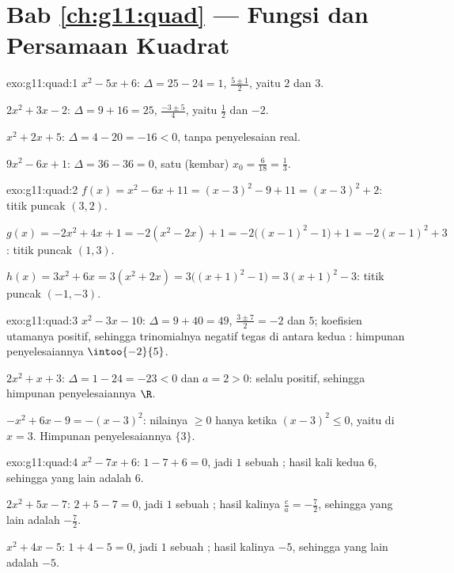 \section*{Bab \ref{ch:g11:quad} --- Fungsi dan Persamaan Kuadrat}

\begin{solution}{exo:g11:quad:1}
$x^2-5x+6$: $\Delta = 25 - 24 = 1$,  $\frac{5 \pm 1}{2}$, yaitu $2$
dan $3$.

$2x^2+3x-2$: $\Delta = 9 + 16 = 25$,  $\frac{-3 \pm 5}{4}$, yaitu
$\frac12$ dan $-2$.

$x^2+2x+5$: $\Delta = 4 - 20 = -16 < 0$, tanpa penyelesaian real.

$9x^2-6x+1$: $\Delta = 36 - 36 = 0$, satu  (kembar)
$x_0 = \frac{6}{18} = \frac13$.
\end{solution}

\begin{solution}{exo:g11:quad:2}
$f(x) = x^2 - 6x + 11 = (x-3)^2 - 9 + 11 = (x-3)^2 + 2$: titik puncak $(3, 2)$.

$g(x) = -2x^2+4x+1 = -2(x^2 - 2x) + 1 = -2\bigl((x-1)^2 - 1\bigr) + 1
= -2(x-1)^2 + 3$: titik puncak $(1, 3)$.

$h(x) = 3x^2 + 6x = 3(x^2 + 2x) = 3\bigl((x+1)^2 - 1\bigr)
= 3(x+1)^2 - 3$: titik puncak $(-1, -3)$.
\end{solution}

\begin{solution}{exo:g11:quad:3}
$x^2 - 3x - 10$: $\Delta = 9 + 40 = 49$,  $\frac{3 \pm 7}{2} = -2$
dan $5$; koefisien utamanya positif, sehingga trinomialnya negatif
tegas di antara kedua : himpunan penyelesaiannya $\intoo{-2}{5}$.

$2x^2 + x + 3$: $\Delta = 1 - 24 = -23 < 0$ dan $a = 2 > 0$: selalu
positif, sehingga himpunan penyelesaiannya $\R$.

$-x^2 + 6x - 9 = -(x-3)^2$: nilainya $\geq 0$ hanya ketika $(x-3)^2 \leq 0$,
yaitu di $x = 3$. Himpunan penyelesaiannya $\{3\}$.
\end{solution}

\begin{solution}{exo:g11:quad:4}
$x^2 - 7x + 6$: $1 - 7 + 6 = 0$, jadi $1$ sebuah ; hasil kali kedua
 $6$, sehingga  yang lain adalah $6$.

$2x^2 + 5x - 7$: $2 + 5 - 7 = 0$, jadi $1$ sebuah ; hasil kalinya
$\frac{c}{a} = -\frac72$, sehingga  yang lain adalah $-\frac72$.

$x^2 + 4x - 5$: $1 + 4 - 5 = 0$, jadi $1$ sebuah ; hasil kalinya $-5$,
sehingga  yang lain adalah $-5$.
\end{solution}

